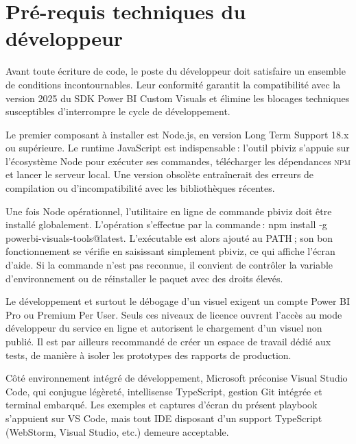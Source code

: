 
\section{Pré-requis techniques du développeur}\label{sec:ch4_prerequis}

Avant toute écriture de code, le poste du développeur doit satisfaire un ensemble de conditions incontournables. Leur conformité garantit la compatibilité avec la version 2025 du SDK Power BI Custom Visuals et élimine les blocages techniques susceptibles d’interrompre le cycle de développement.

Le premier composant à installer est Node.js, en version Long Term Support 18.x ou supérieure. Le runtime JavaScript est indispensable : l’outil pbiviz s’appuie sur l’écosystème Node pour exécuter ses commandes, télécharger les dépendances \textsc{npm} et lancer le serveur local. Une version obsolète entraînerait des erreurs de compilation ou d’incompatibilité avec les bibliothèques récentes.

Une fois Node opérationnel, l’utilitaire en ligne de commande pbiviz doit être installé globalement. L’opération s’effectue par la commande : npm install -g powerbi-visuals-tools@latest. L’exécutable est alors ajouté au \textsc{PATH} ; son bon fonctionnement se vérifie en saisissant simplement pbiviz, ce qui affiche l’écran d’aide. Si la commande n’est pas reconnue, il convient de contrôler la variable d’environnement ou de réinstaller le paquet avec des droits élevés.

Le développement et surtout le débogage d’un visuel exigent un compte Power BI Pro ou Premium Per User. Seuls ces niveaux de licence ouvrent l’accès au mode développeur du service en ligne et autorisent le chargement d’un visuel non publié. Il est par ailleurs recommandé de créer un espace de travail dédié aux tests, de manière à isoler les prototypes des rapports de production.

Côté environnement intégré de développement, Microsoft préconise Visual Studio Code, qui conjugue légèreté, intellisense TypeScript, gestion Git intégrée et terminal embarqué. Les exemples et captures d’écran du présent playbook s’appuient sur VS Code, mais tout IDE disposant d’un support TypeScript (WebStorm, Visual Studio, etc.) demeure acceptable.

